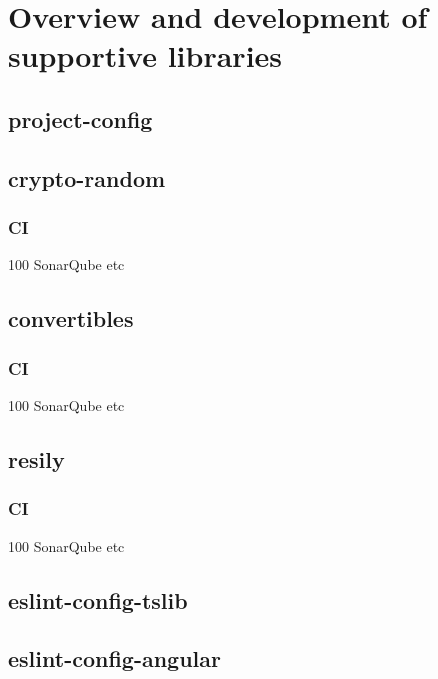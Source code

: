 \chapter{Overview and development of supportive libraries}
\label{chapter:libraries}

\section{project-config}

\section{crypto-random}
\subsection{CI}
100%
SonarQube
etc

\section{convertibles}
\subsection{CI}
100%
SonarQube
etc

\section{resily}
\subsection{CI}
100%
SonarQube
etc

\section{eslint-config-tslib}
\section{eslint-config-angular}
